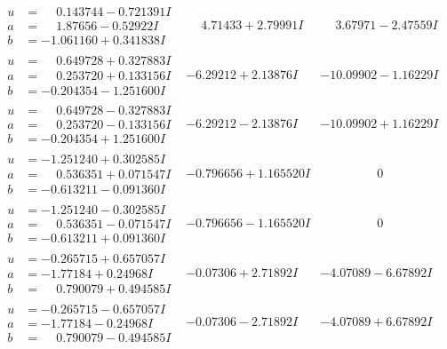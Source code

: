 \documentclass[1p]{elsarticle_modified}
\theoremstyle{definition}
\begin{document}
$$\begin{array}{c|c|c}
\begin{aligned}
u &= \phantom{-}0.143744 - 0.721391 I \\
a &= \phantom{-}1.87656 - 0.52922 I \\
b &= -1.061160 + 0.341838 I\end{aligned}
 & \phantom{-}4.71433 + 2.79991 I & \phantom{-}3.67971 - 2.47559 I \\ \hline\begin{aligned}
u &= \phantom{-}0.649728 + 0.327883 I \\
a &= \phantom{-}0.253720 + 0.133156 I \\
b &= -0.204354 - 1.251600 I\end{aligned}
 & -6.29212 + 2.13876 I & -10.09902 - 1.16229 I \\ \hline\begin{aligned}
u &= \phantom{-}0.649728 - 0.327883 I \\
a &= \phantom{-}0.253720 - 0.133156 I \\
b &= -0.204354 + 1.251600 I\end{aligned}
 & -6.29212 - 2.13876 I & -10.09902 + 1.16229 I \\ \hline\begin{aligned}
u &= -1.251240 + 0.302585 I \\
a &= \phantom{-}0.536351 + 0.071547 I \\
b &= -0.613211 - 0.091360 I\end{aligned}
 & -0.796656 + 1.165520 I & \phantom{-0.000000 } 0 \\ \hline\begin{aligned}
u &= -1.251240 - 0.302585 I \\
a &= \phantom{-}0.536351 - 0.071547 I \\
b &= -0.613211 + 0.091360 I\end{aligned}
 & -0.796656 - 1.165520 I & \phantom{-0.000000 } 0 \\ \hline\begin{aligned}
u &= -0.265715 + 0.657057 I \\
a &= -1.77184 + 0.24968 I \\
b &= \phantom{-}0.790079 + 0.494585 I\end{aligned}
 & -0.07306 + 2.71892 I & -4.07089 - 6.67892 I \\ \hline\begin{aligned}
u &= -0.265715 - 0.657057 I \\
a &= -1.77184 - 0.24968 I \\
b &= \phantom{-}0.790079 - 0.494585 I\end{aligned}
 & -0.07306 - 2.71892 I & -4.07089 + 6.67892 I\\

\end{array}$$
\end{document}
